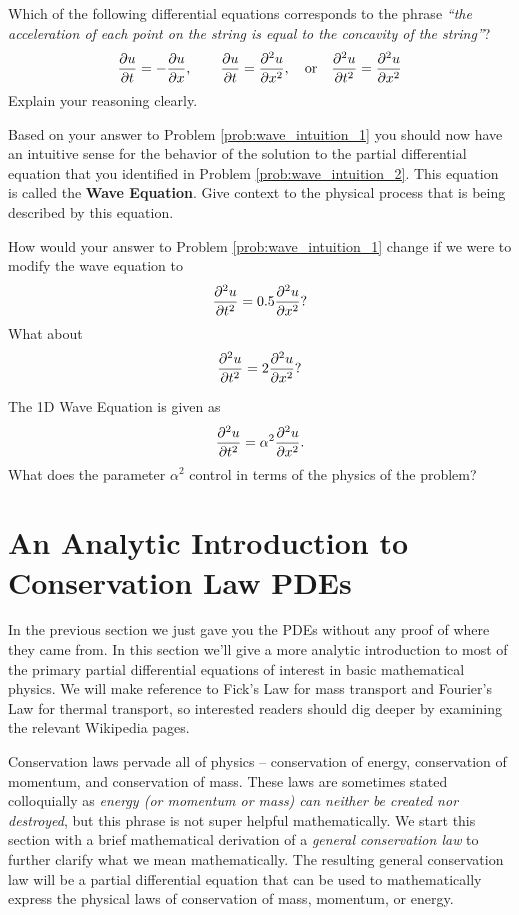 \begin{problem}\label{prob:wave_intuition_2}
    Which of the following differential equations corresponds to the phrase 
        {\it ``the acceleration of each point on the string is equal to the concavity
        of the string''}?
        \[ \frac{\partial{u}}{\partial{t}} = -\frac{\partial{u}}{\partial{x}}, \qquad \frac{\partial{u}}{\partial{t}} = \frac{\partial^2{u}}{\partial{x}^2}, \quad \text{or} \quad \frac{\partial^2{u}}{\partial{t}^2} =
        \frac{\partial^2{u}}{\partial{x}^2} \]
        Explain your reasoning clearly.
\end{problem}

\begin{problem}
    Based on your answer to Problem \ref{prob:wave_intuition_1} you should now have an
    intuitive sense for the behavior of the solution to the partial differential equation
    that you identified in Problem \ref{prob:wave_intuition_2}.  This equation is called
    the {\bf Wave Equation}.  Give context to the physical process that is being described
    by this equation.
\end{problem}


\begin{problem}
    How would your answer to Problem \ref{prob:wave_intuition_1} change if we were to
    modify the wave equation to 
    \[ \frac{\partial^2{u}}{\partial{t}^2} = 0.5 \frac{\partial^2{u}}{\partial{x}^2}? \]
    What about 
    \[ \frac{\partial^2{u}}{\partial{t}^2} = 2 \frac{\partial^2{u}}{\partial{x}^2}? \]
\end{problem}

\begin{problem}
    The 1D Wave Equation is given as 
    \[ \frac{\partial^2{u}}{\partial{t}^2} = \alpha^2 \frac{\partial^2{u}}{\partial{x}^2}. \]
    What does the parameter $\alpha^2$ control in terms of the physics of the problem?
\end{problem}



\newpage\section{An Analytic Introduction to Conservation Law PDEs}
In the previous section
we just gave you the PDEs without any proof of where they came from.  In this section
we'll give a more analytic introduction to most of the primary partial
differential equations of interest in basic mathematical physics.  We will make reference
to Fick's Law for mass transport and Fourier's Law for thermal transport, so interested
readers should dig deeper by examining the relevant Wikipedia pages.
  
Conservation laws pervade all of physics -- conservation of energy, conservation of
momentum, and conservation of mass.  These laws are sometimes stated colloquially as
{\it energy (or momentum or mass) can neither be created nor destroyed}, but this phrase
is not super helpful mathematically.  We start this section with a brief mathematical
derivation of a {\it general conservation law} to further clarify what we mean
mathematically.  The resulting general conservation law will be a
partial differential equation that can be used to mathematically express the physical laws
of conservation of mass, momentum, or
energy.

